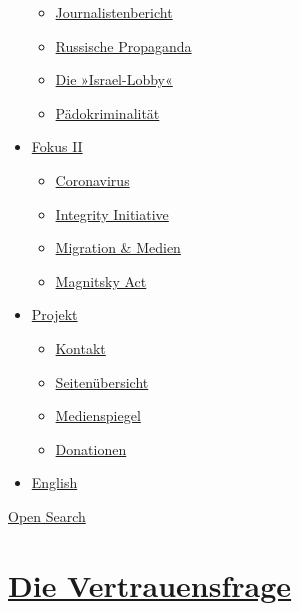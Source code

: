 \begin{itemize}
  \begin{itemize}
  \tightlist
  \item
    \href{https://swprs.org/bericht-eines-journalisten/}{Journalistenbericht}
  \item
    \href{https://swprs.org/russische-propaganda/}{Russische Propaganda}
  \item
    \href{https://swprs.org/die-israel-lobby-fakten-und-mythen/}{Die
    »Israel-Lobby«}
  \item
    \href{https://swprs.org/geopolitik-und-paedokriminalitaet/}{Pädokriminalität}
  \end{itemize}
\item
  \href{https://swprs.org/migration-und-medien/}{Fokus II}

  \begin{itemize}
  \tightlist
  \item
    \href{https://swprs.org/covid-19-hinweis-ii/}{Coronavirus}
  \item
    \href{https://swprs.org/die-integrity-initiative/}{Integrity
    Initiative}
  \item
    \href{https://swprs.org/migration-und-medien/}{Migration \& Medien}
  \item
    \href{https://swprs.org/der-fall-magnitsky/}{Magnitsky Act}
  \end{itemize}
\item
  \href{https://swprs.org/kontakt/}{Projekt}

  \begin{itemize}
  \tightlist
  \item
    \href{https://swprs.org/kontakt/}{Kontakt}
  \item
    \href{https://swprs.org/uebersicht/}{Seitenübersicht}
  \item
    \href{https://swprs.org/medienspiegel/}{Medienspiegel}
  \item
    \href{https://swprs.org/donationen/}{Donationen}
  \end{itemize}
\item
  \href{https://swprs.org/contact/}{English}
\end{itemize}

\protect\hyperlink{}{Open Search}

\hypertarget{die-vertrauensfrage}{%
\section{\texorpdfstring{\href{https://swprs.org/2017/03/01/schweizer-medien-vertrauen/}{Die
Vertrauensfrage}}{Die Vertrauensfrage}}\label{die-vertrauensfrage}}


